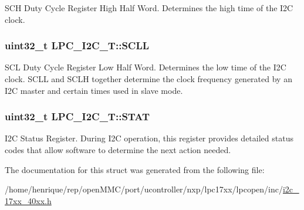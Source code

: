S\-C\-H Duty Cycle Register High Half Word. Determines the high time of the I2\-C clock. \hypertarget{structLPC__I2C__T_a1cd0d0f95f90d6e6c3380f112144085b}{
\subsubsection[{S\-C\-L\-L}]{ uint32\-\_\-t L\-P\-C\-\_\-\-I2\-C\-\_\-\-T\-::\-S\-C\-L\-L}}\label{structLPC__I2C__T_a1cd0d0f95f90d6e6c3380f112144085b}
S\-C\-L Duty Cycle Register Low Half Word. Determines the low time of the I2\-C clock. S\-C\-L\-L and S\-C\-L\-H together determine the clock frequency generated by an I2\-C master and certain times used in slave mode. \hypertarget{structLPC__I2C__T_ae806722ff38a93680338e5607d96156d}{
\subsubsection[{S\-T\-A\-T}]{ uint32\-\_\-t L\-P\-C\-\_\-\-I2\-C\-\_\-\-T\-::\-S\-T\-A\-T}}\label{structLPC__I2C__T_ae806722ff38a93680338e5607d96156d}
I2\-C Status Register. During I2\-C operation, this register provides detailed status codes that allow software to determine the next action needed. 

The documentation for this struct was generated from the following file\-:\begin{DoxyCompactItemize}
\item 
/home/henrique/rep/open\-M\-M\-C/port/ucontroller/nxp/lpc17xx/lpcopen/inc/\hyperlink{i2c__17xx__40xx_8h}{i2c\-\_\-17xx\-\_\-40xx.\-h}\end{DoxyCompactItemize}
